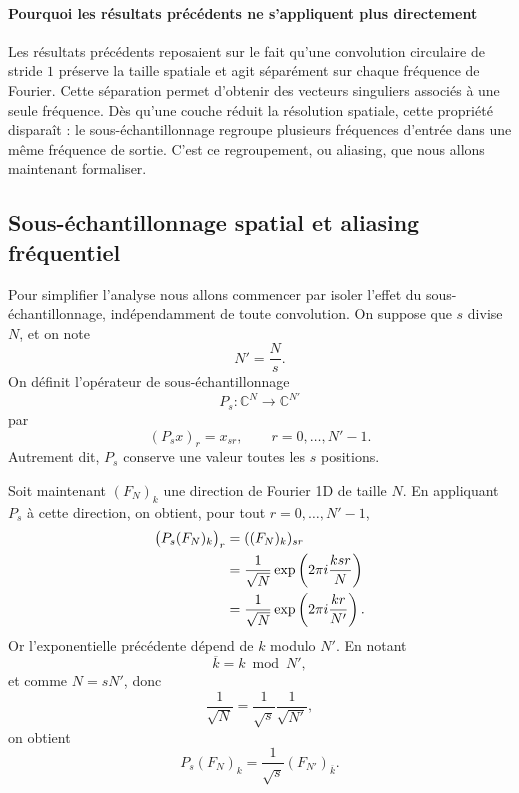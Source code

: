 \paragraph{Pourquoi les résultats précédents ne s'appliquent plus directement}

Les résultats précédents reposaient sur le fait qu'une convolution circulaire de stride $1$
préserve la taille spatiale et agit séparément sur chaque fréquence de Fourier. Cette séparation
permet d'obtenir des vecteurs singuliers associés à une seule fréquence. Dès qu'une couche réduit
la résolution spatiale, cette propriété disparaît : le sous-échantillonnage regroupe plusieurs
fréquences d'entrée dans une même fréquence de sortie. C'est ce regroupement, ou aliasing,
que nous allons maintenant formaliser.

\subsection{Sous-échantillonnage spatial et aliasing fréquentiel}

Pour simplifier l'analyse nous allons commencer par isoler l'effet du sous-échantillonnage, indépendamment de toute convolution.
On suppose que $s$ divise $N$, et on note
\[
    N' = \frac{N}{s}.
\]
On définit l'opérateur de sous-échantillonnage
\[
    P_s : \mathbb{C}^N \longrightarrow \mathbb{C}^{N'}
\]
par
\begin{equation*}
    (P_s x)_r = x_{sr},
    \qquad r = 0,\dots,N'-1.
\end{equation*}
Autrement dit, $P_s$ conserve une valeur toutes les $s$ positions.

Soit maintenant $(F_N)_k$ une direction de Fourier 1D de taille $N$. En appliquant $P_s$ à cette
direction, on obtient, pour tout $r=0,\dots,N'-1$,
\begin{align*}
    \big(P_s (F_N)_k\big)_r
    &= ((F_N)_k)_{sr} \notag \\
    &= \frac{1}{\sqrt{N}}
       \exp\left(2\pi i \frac{k sr}{N}\right) \notag \\
    &= \frac{1}{\sqrt{N}}
       \exp\left(2\pi i \frac{k r}{N'}\right).
\end{align*}
Or l'exponentielle précédente dépend de $k$ modulo $N'$. En notant
\[
    \overline{k} = k \bmod N',
\]
et comme $N=sN'$, donc
\[
    \frac{1}{\sqrt{N}} = \frac{1}{\sqrt{s}}\frac{1}{\sqrt{N'}},
\]
on obtient
\begin{equation}
    P_s (F_N)_k
    =
    \frac{1}{\sqrt{s}}(F_{N'})_{\overline{k}}.
    \label{eq:sous_echantillonnage_fourier_1d}
\end{equation}

